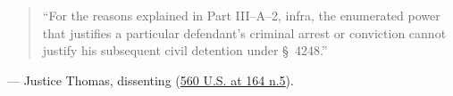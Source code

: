 \documentclass[12pt]{article}
\begin{document}
\begin{quote}
``For the reasons explained in Part III--A--2, infra, the enumerated power that justifies a particular defendant's criminal arrest or conviction cannot justify his subsequent civil detention under \S~4248.''
\end{quote}
\noindent --- Justice Thomas, dissenting (\href{https://www.law.cornell.edu/supct/html/08-1224.ZD.html}{560 U.S. at 164 n.5}).
\end{document}
